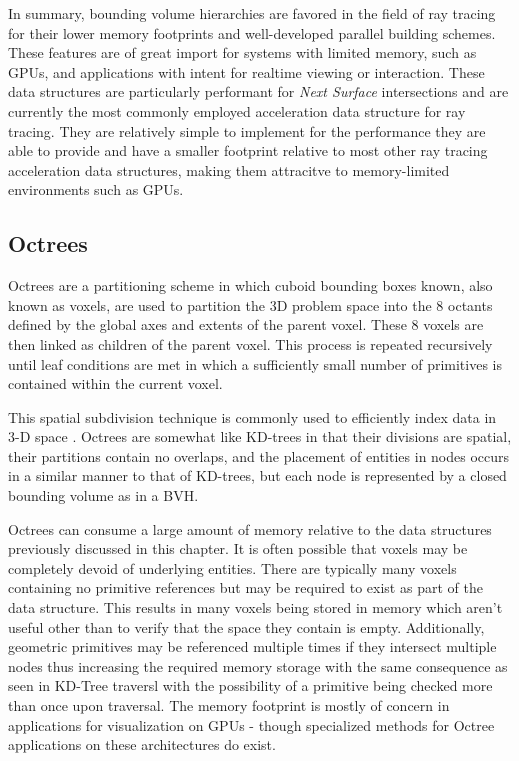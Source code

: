 In summary, bounding volume hierarchies are favored in the field of ray tracing
for their lower memory footprints and well-developed parallel building
schemes. These features are of great import for systems with limited memory,
such as GPUs, and applications with intent for realtime viewing or
interaction. These data structures are particularly performant for \textit{Next
  Surface} intersections and are currently the most commonly employed
acceleration data structure for ray tracing. They are relatively simple to
implement for the performance they are able to provide and have a smaller
footprint relative to most other ray tracing acceleration data structures,
making them attracitve to memory-limited environments such as GPUs.

\subsection{Octrees}%
\label{subsec:octree}

Octrees are a partitioning scheme in which cuboid bounding boxes known, also
known as voxels, are used to partition the 3D problem space into the 8 octants
defined by the global axes and extents of the parent voxel. These 8 voxels are
then linked as children of the parent voxel. This process is repeated
recursively until leaf conditions are met in which a sufficiently small number
of primitives is contained within the current voxel.

This spatial subdivision technique is commonly used to efficiently index
data in 3-D space \cite{Glassner_1989}. Octrees are somewhat like KD-trees in
that their divisions are spatial, their partitions contain no overlaps, and the
placement of entities in nodes occurs in a similar manner to that of KD-trees,
but each node is represented by a closed bounding volume as in a BVH.

Octrees can consume a large amount of memory relative to the data
structures previously discussed in this chapter. It is often possible that
voxels may be completely devoid of underlying entities. There are typically many
voxels containing no primitive references but may be required to exist as part
of the data structure. This results in many voxels being stored in memory which
aren't useful other than to verify that the space they contain is
empty. Additionally, geometric primitives may be referenced multiple times if
they intersect multiple nodes thus increasing the required memory storage with
the same consequence as seen in KD-Tree traversl with the possibility of a
primitive being checked more than once upon traversal. The memory footprint is
mostly of concern in applications for visualization on GPUs - though specialized methods for Octree applications on these architectures do exist.

